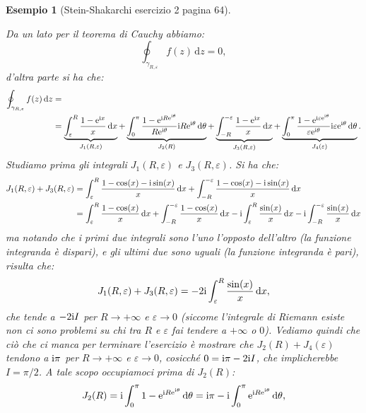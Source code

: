 \documentclass[11pt]{book}
\theoremstyle{Definizione}
\theoremstyle{TeoremaProposizioneLemmaCorollarioCongettura}
\theoremstyle{OsservazioneNotaEsempio}
\newtheorem{myes}{Esempio}[section]
\renewcommand{\i}{\textup{i}}
\newcommand{\e}{\textup{e}}
\renewcommand{\d}{\mathrm{d}}
\newcommand{\dz}{\,\d z}
\newcommand{\dx}{\,\d x}
\newcommand{\dtheta}{\, \d \theta}
\begin{document}
\begin{myes}[Stein-Shakarchi esercizio 2 pagina 64]
\begin{center}
\end{center}
Da un lato per il teorema di Cauchy abbiamo:
$$
\oint_{\gamma_{R,\varepsilon}} f(z) \dz = 0,
$$
d'altra parte si ha che:
\begin{align*}
\oint_{\gamma_{R,\varepsilon}} f(z)\dz &=\\
&= \underbrace{\int_{\varepsilon}^{R} \frac{1-\e^{\i x}}{x}\dx}_{J_1(R,\varepsilon)} + \underbrace{\int_0^{\pi} \frac{1-\e^{\i R \e^{\i\theta}}}{R \e^{\i\theta}}\i R \e^{\i\theta}\dtheta}_{J_2(R)} + \underbrace{\int_{-R}^{-\varepsilon} \frac{1-\e^{\i x}}{x}\dx}_{J_3(R,\varepsilon)} + \underbrace{\int_0^{\pi} \frac{1-\e^{\i\varepsilon\e^{\i\theta}}}{\varepsilon\e^{\i\theta}}\i\varepsilon\e^{\i\theta}\dtheta}_{J_4(\varepsilon)}.
\end{align*}
Studiamo prima gli integrali $J_1(R,\varepsilon)$ e $J_3(R,\varepsilon)$. Si ha che:
\begin{align*}
J_1(R,\varepsilon)+J_3(R,\varepsilon) &= \int_{\varepsilon}^{R} \frac{1-\cos(x)-\i\sin(x)}{x}\dx + \int_{-R}^{-\varepsilon} \frac{1-\cos(x)-\i \sin(x)}{x}\dx\\
&=  \int_{\varepsilon}^{R} \frac{1-\cos(x)}{x}\dx + \int_{-R}^{-\varepsilon} \frac{1-\cos(x)}{x}\dx - \i \int_{\varepsilon}^{R} \frac{\sin(x)}{x}\dx - \i \int_{-R}^{-\varepsilon} \frac{\sin(x)}{x}\dx
\end{align*}
ma notando che i primi due integrali sono l'uno l'opposto dell'altro (la funzione integranda è dispari), e gli ultimi due sono uguali (la funzione integranda è pari), risulta che:
$$
J_1(R,\varepsilon)+J_3(R,\varepsilon) = -2\i \int_{\varepsilon}^{R} \frac{\sin(x)}{x}\dx,
$$
che tende a $-2\i I$ per $R \to +\infty$ e $\varepsilon \to 0$ (siccome l'integrale di Riemann esiste non ci sono problemi su chi tra $R$ e $\varepsilon$ fai tendere a $+\infty$ o $0$). Vediamo quindi che ciò che ci manca per terminare l'esercizio è mostrare che $J_2(R)+J_4(\varepsilon)$ tendono a $\i \pi$ per $R \to +
\infty$ e $\varepsilon \to 0$, cosicché $ 0 = \i \pi - 2\i I$, che implicherebbe $I = \pi/2$. A tale scopo occupiamoci prima di $J_2(R)$:
$$
J_2(R) = \i \int_{0}^{\pi} 1-\e^{\i R \e^{\i\theta}}\dtheta = \i \pi - \i \int_0^{\pi} \e^{\i R \e^{\i\theta}}\dtheta,
$$
\end{myes}
\end{document}
